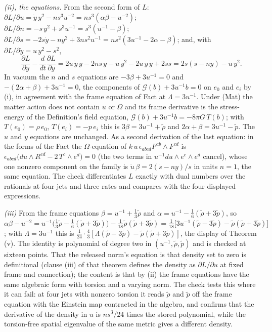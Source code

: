 \emph{(ii), the equations.} From the second form of $L$: $\partial L/\partial u = \dot y\,y^{2} - n s^{3}u^{-2} = n s^{3}(\alpha\beta - u^{-2})$; $\partial L/\partial n = -s\,y^{2} + s^{3}u^{-1} = s^{3}(u^{-1} - \beta)$; $\partial L/\partial s = -2s\dot y - n y^{2} + 3n s^{2}u^{-1} = n s^{2}(3u^{-1} - 2\alpha - \beta)$; and, with $\partial L/\partial\dot y = u\,y^{2} - s^{2}$,
\[
\frac{\partial L}{\partial y} - \frac{d}{dt}\frac{\partial L}{\partial\dot y} = 2u\,\dot y\,y - 2n s\,y - \dot u\,y^{2} - 2u\,y\,\dot y + 2s\dot s = 2s(\dot s - n y) - \dot u\,y^{2}.
\]
In vacuum the $n$ and $s$ equations are $-3\beta + 3u^{-1} = 0$ and $-(2\alpha + \beta) + 3u^{-1} = 0$, the components of $\mathcal{G}(b) + 3u^{-1}b = 0$ on $e_{0}$ and $e_{i}$ by (i), in agreement with the frame equation of Fact  at $\Lambda = 3u^{-1}$. Under (Mat) the matter action does not contain $u$ or $\Omega$ and its frame derivative is the stress-energy of the Definition's field equation, $\mathcal{G}(b) + 3u^{-1}b = -8\pi G\,T(b)$; with $T(e_{0}) = \rho\,e_{0}$, $T(e_{i}) = -p\,e_{i}$ this is $3\beta = 3u^{-1} + \tilde\rho$ and $2\alpha + \beta = 3u^{-1} - \tilde p$. The $u$ and $y$ equations are unchanged. As a second derivation of the last equation: in the forms of the Fact the $\Omega$-equation of $k\,u\,\epsilon_{abcd}F^{ab} \wedge F^{cd}$ is $\epsilon_{abcd}\bigl(du \wedge R^{cd} - 2\,T^{c} \wedge e^{d}\bigr) = 0$ (the two terms in $u^{-1}du \wedge e^{c} \wedge e^{d}$ cancel), whose one nonzero component on the family is $\dot u\,\beta = 2(\dot s - n y)/s$ in units $n = 1$, the same equation. The check differentiates $L$ exactly with dual numbers over the rationals at four jets and three rates and compares with the four displayed expressions.

\emph{(iii)} From the frame equations $\beta = u^{-1} + \tfrac13\tilde\rho$ and $\alpha = u^{-1} - \tfrac16(\tilde\rho + 3\tilde p)$, so $\alpha\beta - u^{-2} = u^{-1}\bigl(\tfrac13\tilde\rho - \tfrac16(\tilde\rho + 3\tilde p)\bigr) - \tfrac1{18}\tilde\rho(\tilde\rho + 3\tilde p) = \tfrac1{18}\bigl[3u^{-1}(\tilde\rho - 3\tilde p) - \tilde\rho(\tilde\rho + 3\tilde p)\bigr]$; with $\Lambda = 3u^{-1}$ this is $\tfrac{1}{24}\cdot\tfrac43[\Lambda(\tilde\rho - 3\tilde p) - \tilde\rho(\tilde\rho + 3\tilde p)]$, the display of Theorem (v). The identity is polynomial of degree two in $(u^{-1}, \tilde\rho, \tilde p)$ and is checked at sixteen points. That the released norm's equation is that density set to zero is definitional (clause (iii) of that theorem defines the density as $\partial L/\partial u$ at fixed frame and connection); the content is that by (ii) the frame equations have the same algebraic form with torsion and a varying norm. The check tests this where it can fail: at four jets with nonzero torsion it reads $\tilde\rho$ and $\tilde p$ off the frame equation with the Einstein map contracted in the algebra, and confirms that the derivative of the density in $u$ is $n s^{3}/24$ times the stored polynomial, while the torsion-free spatial eigenvalue of the same metric gives a different density.

